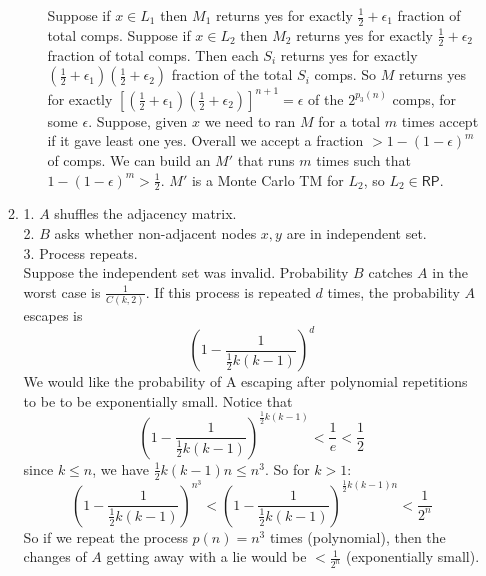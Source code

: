 \documentclass[a4paper, draft, 12pt]{article}
\begin{document}
\begin{enumerate}
\begin{enumerate}
\begin{enumerate}
  Suppose if $x \in L_1$ then $M_1$ returns yes for exactly $\frac{1}{2} + \epsilon_1$ fraction of total comps.
  Suppose if $x \in L_2$ then $M_2$ returns yes for exactly $\frac{1}{2} + \epsilon_2$ fraction of total comps.
  Then each $S_i$ returns yes for exactly $(\frac{1}{2} + \epsilon_1)(\frac{1}{2} + \epsilon_2)$ 
  fraction of the total $S_i$ comps. So $M$ returns yes for exactly 
  $[(\frac{1}{2} + \epsilon_1)(\frac{1}{2} + \epsilon_2)]^{n+1} = \epsilon$ of the $2^{p_3(n)}$ comps,
  for some $\epsilon$. Suppose, given $x$ we need to ran $M$ for a total $m$ times accept if it gave least one yes.
  Overall we accept a fraction $> 1-(1-\epsilon)^m$ of comps. We can build an $M'$ that runs $m$ times such that 
  $1-(1-\epsilon)^m > \frac{1}{2}$. $M'$ is a Monte Carlo TM for $L_2$, so $L_2 \in \textsf{RP}$. 
  \end{enumerate}
  \item %
  1. $A$ shuffles the adjacency matrix. \\
  2. $B$ asks whether non-adjacent nodes $x,y$ are in independent set.\\
  3. Process repeats. \\
  Suppose the independent set was invalid. 
  Probability $B$ catches $A$ in the worst case is $\frac{1}{C(k,2)}$.
  If this process is repeated $d$ times, the probability $A$ escapes is 
  $$\left(1- \frac{1}{\frac{1}{2}k(k-1)}\right)^d$$
  We would like the probability of A escaping after polynomial 
  repetitions to be to be exponentially small.
  Notice that 
  $$ \left(1- \frac{1}{\frac{1}{2}k(k-1)}\right)^{\frac{1}{2}k(k-1)} < \frac{1}{e} <  \frac{1}{2} $$
  since $k \leqslant n$, we have $\frac{1}{2}k(k-1)n \leqslant n^3$. So for $k > 1$:
  $$ \left(1- \frac{1}{\frac{1}{2}k(k-1)}\right)^{n^3} < 
  \left(1- \frac{1}{\frac{1}{2}k(k-1)}\right)^{\frac{1}{2}k(k-1)n} <  
  \frac{1}{2^n} $$
  So if we repeat the process $p(n) = n^3$ times (polynomial), then the 
  changes of $A$ getting away with a lie would be $< \frac{1}{2^n}$ (exponentially small).  



  \end{enumerate}


\end{enumerate}
\end{document}
